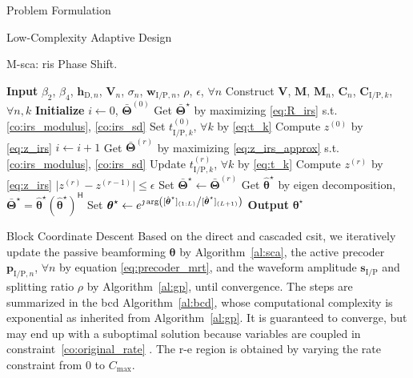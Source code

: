 \begin{section}{Problem Formulation}
\begin{subsection}{Low-Complexity Adaptive Design}
		\begin{algorithm}[!t]
			\caption{M-\gls{sca}: \gls{ris} Phase Shift.}
			\label{al:m_sca}
			\begin{algorithmic}[1]
				\State \textbf{Input} $\beta_2$, $\beta_4$, $\mathbf{h}_{\mathrm{D},n}$, $\mathbf{V}_{n}$, $\sigma_n$, $\mathbf{w}_{\mathrm{I/P},n}$, $\rho$, $\epsilon$, $\forall n$
				\State Construct $\mathbf{V}$, $\mathbf{M}$, $\mathbf{M}_n$, $\mathbf{C}_{n}$, $\mathbf{C}_{\mathrm{I/P},k}$, $\forall n,k$
				\State \textbf{Initialize} $i \gets 0$, $\bar{\mathbf{\Theta}}^{(0)}$
					\State Get $\bar{\mathbf{\Theta}}^{\star}$ by maximizing \eqref{eq:R_irs} s.t. \eqref{co:irs_modulus}, \eqref{co:irs_sd}
				\Else
					\State Set $t_{\mathrm{I/P},k}^{(0)}$, $\forall k$ by \eqref{eq:t_k}
					\State Compute $z^{(0)}$ by \eqref{eq:z_irs}
					\Repeat
						\State $i \gets i + 1$
							\State Get $\bar{\mathbf{\Theta}}^{(r)}$ by maximizing \eqref{eq:z_irs_approx} s.t. \eqref{co:irs_modulus}, \eqref{co:irs_sd}
							\State Update $t_{\mathrm{I/P},k}^{(r)}$, $\forall k$ by \eqref{eq:t_k}
							\State Compute $z^{(r)}$ by \eqref{eq:z_irs}
					\Until $\lvert z^{(r)}-z^{(r-1)} \rvert \le \epsilon$
					\State Set $\bar{\mathbf{\Theta}}^{\star} \gets \bar{\mathbf{\Theta}}^{(r)}$
				\EndIf
				\State Get $\hat{\boldsymbol{\theta}}^\star$ by eigen decomposition, $\bar{\mathbf{\Theta}}^{\star}=\hat{\boldsymbol{\theta}}^\star(\hat{\boldsymbol{\theta}}^\star)^\mathsf{H}$
				\State Set $\boldsymbol{\theta}^{\star} \gets e^{\jmath  \arg\left([\hat{\boldsymbol{\theta}}^\star]_{(1:L)} \middle/ [\hat{\boldsymbol{\theta}}^\star]_{(L+1)}\right)}$
				\State \textbf{Output} $\boldsymbol{\theta}^{\star}$
			\end{algorithmic}
		\end{algorithm}
	\end{subsection}


	\begin{subsection}{Block Coordinate Descent}
		Based on the direct and cascaded \gls{csit}, we iteratively update the passive beamforming $\boldsymbol{\theta}$ by Algorithm~\ref{al:sca}, the active precoder $\mathbf{p}_{\mathrm{I/P},n}$, $\forall n$ by equation \eqref{eq:precoder_mrt}, and the waveform amplitude $\mathbf{s}_{\mathrm{I/P}}$ and splitting ratio $\rho$ by Algorithm~\ref{al:gp}, until convergence. The steps are summarized in the \gls{bcd} Algorithm~\ref{al:bcd}, whose computational complexity is exponential as inherited from Algorithm~\ref{al:gp}. It is guaranteed to converge, but may end up with a suboptimal solution because variables are coupled in constraint~\eqref{co:original_rate} \cite{Grippo2000}.
		The \gls{r-e} region is obtained by varying the rate constraint from \num{0} to $C_{\max}$.


\end{subsection}
\end{section}
